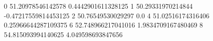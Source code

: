 0 51.20978546142578 0.4442901611328125
1 50.29331970214844 -0.47217559814453125
2 50.76549530029297 0.0
4 51.02516174316406 0.25966644287109375
6 52.748966217041016 1.9834709167480469
8 54.815093994140625 4.049598693847656
